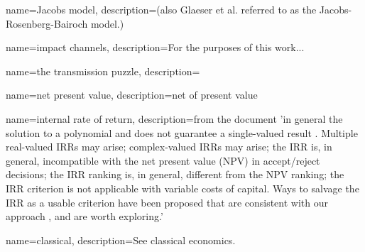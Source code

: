 












{
name=Jacobs model,
description={(also Glaeser et al. \cite{glaeserGrowthCities1991} referred to as the Jacobs-Rosenberg-Bairoch model.)} 
}

{
name=impact channels,
description={For the purposes of this work...}
}

{
name=the transmission puzzle,
description={}
}

{
name=net present value,
description={net of \gls{present value}}
}

{
name=internal rate of return,
description={from the document 'in general the solution to a polynomial and does not guarantee a single-valued result \cite{robinsonOptimalTerminationIRR1996}. Multiple real-valued  IRRs may arise;  complex-valued IRRs may arise;  the IRR is, in general, incompatible with the net present value (NPV) in accept/reject decisions; the IRR ranking is, in general, different from the NPV ranking; the IRR criterion is not applicable with variable costs of capital. Ways to salvage the IRR as a usable criterion have been proposed that are consistent with our approach \cite{magniAverageInternalRate2010}, and are worth exploring.'}
}

{
name=classical,
description={See \gls{classical economics}.}
}

